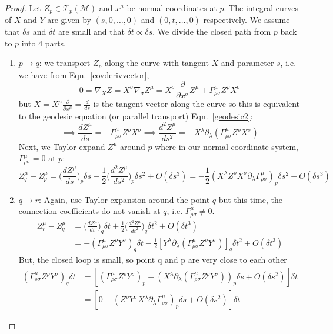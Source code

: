 \documentclass[a4paper]{article}
\theoremstyle{new}
\begin{document}
\begin{proof}
Let $Z_p\in\mathcal{T}_p(\mathcal{M})$ and $x^\mu$ be normal coordinates at $p$. The integral curves of $X$ and $Y$ are given by $(s,0,\dots,0)$ and $(0,t,\dots,0)$ respectively. We assume that $\delta s$ and $\delta t$ are small and that $\delta t\propto\delta s$. We divide the closed path from $p$ back to $p$ into 4 parts.
\begin{enumerate}
    \item $p\rightarrow q$: we transport $Z_p$ along the curve with tangent $X$ and parameter $s$, i.e. we have from Eqn.~\ref{covderivvector},
    $$0=\nabla_XZ=X^\sigma\nabla_\sigma Z^\mu=X^\sigma\frac{\partial}{\partial x^\sigma}Z^\mu+\Gamma^\mu_{\rho\sigma}Z^\rho X^\sigma$$
    but $X=X^\mu\frac{\partial}{\partial x^\mu}=\frac{d}{ds}$ is the tangent vector along the curve so this is equivalent to the geodesic equation (or parallel transport) Eqn.~\ref{geodesic2}:
    $$\implies\frac{dZ^\mu}{ds}=-\Gamma^\mu_{\rho\sigma}Z^\rho X^\sigma\implies\frac{d^2Z^\mu}{ds^2}=-X^\lambda\partial_\lambda(\Gamma^\mu_{\rho\sigma}Z^\rho X^\sigma)$$
    Next, we Taylor expand $Z^\mu$ around $p$ where in our normal coordinate system, $\Gamma_{\rho\sigma}^\mu=0$ at $p$:
    $$Z_q^\mu-Z_p^\mu=\bigg(\frac{dZ^\mu}{ds}\bigg)_p\delta s+\frac{1}{2}\bigg(\frac{d^2Z^\mu}{ds^2}\bigg)_p\delta s^2+O(\delta s^3)=-\frac{1}{2}(X^\lambda Z^\rho X^\sigma\partial_\lambda\Gamma^\mu_{\rho\sigma})_p\delta s^2+O(\delta s^3)$$
    \item $q\rightarrow r$: Again, use Taylor expansion around the point $q$ but this time, the connection coefficients do not vanish at $q$, i.e. $\Gamma_{\rho\sigma}^\mu\neq 0$.
    \begin{align}
        Z_r^\mu-Z_q^\mu&=\bigg(\frac{dZ^\mu}{dt}\bigg)_q\delta t+\frac{1}{2}\bigg(\frac{d^2Z^\mu}{dt^2}\bigg)_q\delta t^2+O(\delta t^3)\nonumber\\&=-(\Gamma_{\rho\sigma}^\mu Z^\rho Y^\sigma)_q\delta t-\frac{1}{2}[Y^\lambda\partial_\lambda(\Gamma^\mu_{\rho\sigma}Z^\rho Y^\sigma)]_q\delta t^2+O(\delta t^3)\nonumber
    \end{align}
    But, the closed loop is small, so point q and p are very close to each other
    \begin{align}
    (\Gamma_{\rho\sigma}^\mu Z^\rho Y^\sigma)_q\delta t&=[(\Gamma_{\rho\sigma}^\mu Z^\rho Y^\sigma)_p+(X^\lambda\partial_\lambda(\Gamma^\mu_{\rho\sigma}Z^\rho Y^\sigma))_p\delta s+O(\delta s^2)]\delta t\nonumber\\&=[0+(Z^\rho Y^\sigma X^\lambda\partial_\lambda\Gamma^\mu_{\rho\sigma})_p\delta s+O(\delta s^2)]\delta t\nonumber

\end{align}
\end{enumerate}
\end{proof}
\end{document}
